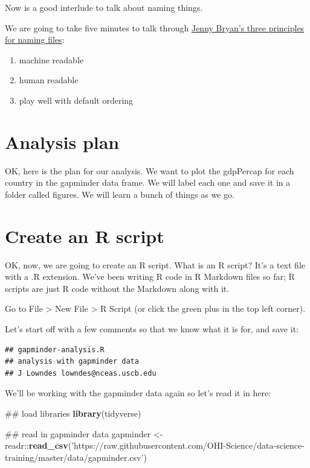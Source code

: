 \documentclass[]{book}
\newenvironment{Shaded}{\begin{snugshade}}{\end{snugshade}}
\newcommand{\KeywordTok}[1]{\textcolor[rgb]{0.13,0.29,0.53}{\textbf{{#1}}}}
\newcommand{\StringTok}[1]{\textcolor[rgb]{0.31,0.60,0.02}{{#1}}}
\newcommand{\NormalTok}[1]{{#1}}
\providecommand{\tightlist}{%
  \setlength{\itemsep}{0pt}\setlength{\parskip}{0pt}}
\theoremstyle{definition}
\theoremstyle{definition}
\theoremstyle{definition}
\theoremstyle{remark}
\begin{document}
Now is a good interlude to talk about naming things.

We are going to take five minutes to talk through
\href{https://speakerdeck.com/jennybc/how-to-name-files}{Jenny Bryan's
three principles for naming files}:

\begin{enumerate}
\def\labelenumi{\arabic{enumi}.}
\tightlist
\item
  machine readable
\item
  human readable
\item
  play well with default ordering
\end{enumerate}

\section{Analysis plan}\label{analysis-plan}

OK, here is the plan for our analysis. We want to plot the gdpPercap for
each country in the gapminder data frame. We will label each one and
save it in a folder called figures. We will learn a bunch of things as
we go.

\section{Create an R script}\label{create-an-r-script}

OK, now, we are going to create an R script. What is an R script? It's a
text file with a .R extension. We've been writing R code in R Markdown
files so far; R scripts are just R code without the Markdown along with
it.

Go to File \textgreater{} New File \textgreater{} R Script (or click the
green plus in the top left corner).

Let's start off with a few comments so that we know what it is for, and
save it:

\begin{verbatim}
## gapminder-analysis.R
## analysis with gapminder data
## J Lowndes lowndes@nceas.uscb.edu
\end{verbatim}

We'll be working with the gapminder data again so let's read it in here:

\begin{Shaded}
\begin{Highlighting}[]
\NormalTok{## load libraries}
\KeywordTok{library}\NormalTok{(tidyverse)}

\NormalTok{## read in gapminder data}
\NormalTok{gapminder <-}\StringTok{ }\NormalTok{readr::}\KeywordTok{read_csv}\NormalTok{(}\StringTok{'https://raw.githubusercontent.com/OHI-Science/data-science-training/master/data/gapminder.csv'}\NormalTok{)}
\end{Highlighting}
\end{Shaded}
\end{document}
